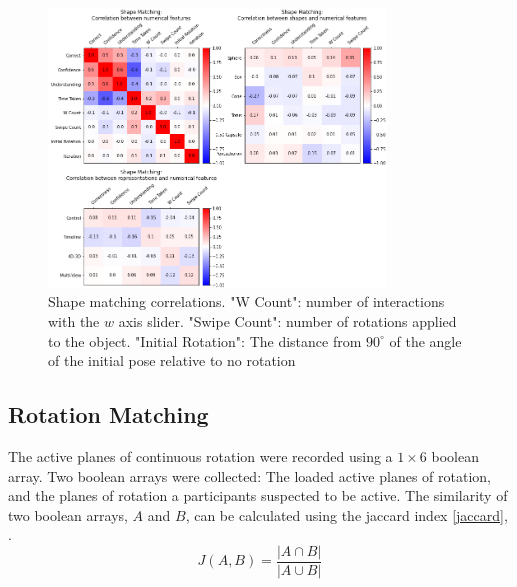 \documentclass{l4proj}
\begin{document}
\begin{figure}
  \centering
  \includegraphics[width=0.8\textwidth]{images/results/shape_matching_correlations.png}
  \caption{Shape matching correlations. "W Count": number of interactions with the $w$ axis slider. "Swipe Count": number of rotations applied to the object. "Initial Rotation": The distance from $90^{\circ}$ of the angle of the initial pose relative to no rotation}
  \label{fig:shape_corr}
\end{figure}

\subsection*{Rotation Matching}

The active planes of continuous rotation were recorded using a $1 \times 6$ boolean array. Two boolean arrays were collected: The loaded active planes of rotation, and the planes of rotation a participants suspected to be active. The similarity of two boolean arrays, $A$ and $B$, can be calculated using the jaccard index \cref{jaccard}, \citep{glen_jaccard_2022}.
%
\begin{equation}
  \label{jaccard}
  J(A, B) = \frac{|A \cap B|}{|A \cup B|}
\end{equation}
\end{document}
